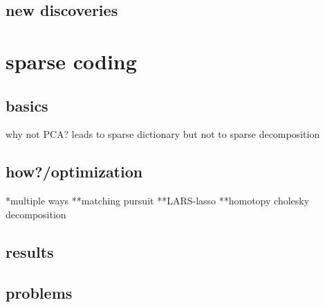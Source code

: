 \subsection{new discoveries}
\section{sparse coding}
\subsection{basics}
why not PCA? leads to sparse dictionary but not to sparse decomposition
\subsection{how?/optimization}
*multiple ways
**matching pursuit
**LARS-lasso
**homotopy
cholesky decomposition
\subsection{results}
\subsection{problems}

